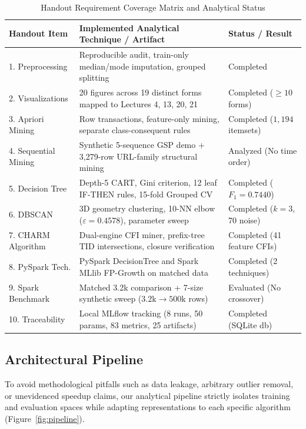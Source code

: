 \documentclass[11pt,a4paper]{article}
\begin{document}
\begin{table}[H]
\centering
\small
\caption{Handout Requirement Coverage Matrix and Analytical Status}
\label{tab:coverage}
\begin{tabularx}{\textwidth}{lXl}
\toprule
\textbf{Handout Item} & \textbf{Implemented Analytical Technique / Artifact} & \textbf{Status / Result} \\
\midrule
1. Preprocessing & Reproducible audit, train-only median/mode imputation, grouped splitting & Completed \\
2. Visualizations & 20 figures across 19 distinct forms mapped to Lectures 4, 13, 20, 21 & Completed ($\ge 10$ forms) \\
3. Apriori Mining & Row transactions, feature-only mining, separate class-consequent rules & Completed ($1{,}194$ itemsets) \\
4. Sequential Mining & Synthetic 5-sequence GSP demo + 3,279-row URL-family structural mining & Analyzed (No time order) \\
5. Decision Tree & Depth-5 CART, Gini criterion, 12 leaf IF-THEN rules, 15-fold Grouped CV & Completed ($F_1 = 0.7440$) \\
6. DBSCAN & 3D geometry clustering, 10-NN elbow ($\varepsilon=0.4578$), parameter sweep & Completed ($k=3$, 70 noise) \\
7. CHARM Algorithm & Dual-engine CFI miner, prefix-tree TID intersections, closure verification & Completed (41 feature CFIs) \\
8. PySpark Tech. & PySpark DecisionTree and Spark MLlib FP-Growth on matched data & Completed (2 techniques) \\
9. Spark Benchmark & Matched 3.2k comparison + 7-size synthetic sweep ($3.2\text{k} \to 500\text{k}$ rows) & Evaluated (No crossover) \\
10. Traceability & Local MLflow tracking (8 runs, 50 params, 83 metrics, 25 artifacts) & Completed (SQLite db) \\
\bottomrule
\end{tabularx}
\end{table}

\subsection{Architectural Pipeline}
To avoid methodological pitfalls such as data leakage, arbitrary outlier removal, or unevidenced speedup claims, our analytical pipeline strictly isolates training and evaluation spaces while adapting representations to each specific algorithm (Figure~\ref{fig:pipeline}).
\end{document}
